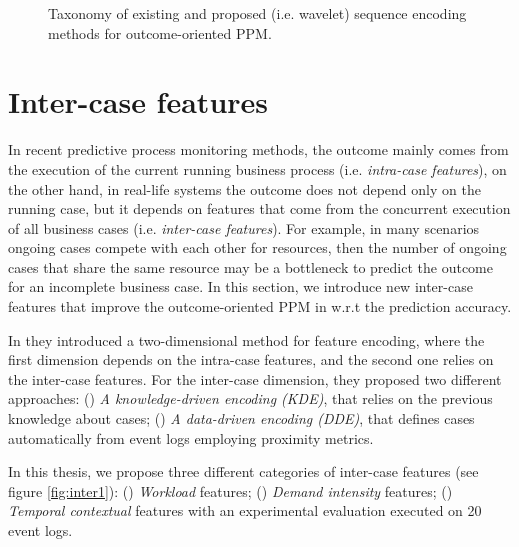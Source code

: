 \begin{figure}[htb]
	\begin{center}
		\caption[Wavelet encoding method taxonomy]{Taxonomy of existing and proposed (i.e. wavelet) sequence encoding methods for outcome-oriented PPM.}
		\label{fig:dwt5}
	\end{center}
\end{figure}

\section{Inter-case features} \label{inter}
In recent predictive process monitoring methods, the outcome mainly comes from the execution of the current running business process (i.e. \textit{intra-case features}), on the other hand, in real-life systems the outcome does not depend only on the running case, but it depends on features that come from the concurrent execution of all business cases (i.e. \textit{inter-case features}). For example, in many scenarios ongoing cases compete with each other for resources, then the number of ongoing cases that share the same resource  may be a bottleneck to predict the outcome for an incomplete business case. In this section, we introduce new inter-case features that improve the outcome-oriented PPM in w.r.t the prediction accuracy.

In \cite{senderovich2019knowledge} they introduced a two-dimensional method for feature encoding, where the first dimension depends on the intra-case features, and the second one relies on the inter-case features. For the inter-case dimension, they proposed two different approaches: () \textit{A knowledge-driven encoding (KDE)}, that relies on the previous knowledge about cases; () \textit{A data-driven encoding (DDE)}, that defines cases automatically from event logs employing proximity metrics. 

In this thesis, we propose three different categories of inter-case features (see figure \ref{fig:inter1}): () \textit{Workload} features; () \textit{Demand intensity} features; () \textit{Temporal contextual} features with an experimental evaluation executed on 20 event logs.

